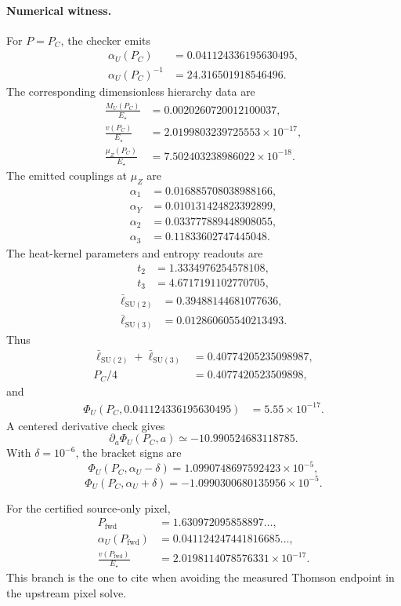 \paragraph{Numerical witness.}
For \(P=P_C\), the checker emits
\[
\begin{aligned}
\alpha_U(P_C)&=0.041124336195630495,\\
\alpha_U(P_C)^{-1}&=24.316501918546496.
\end{aligned}
\]
The corresponding dimensionless hierarchy data are
\[
\begin{aligned}
\frac{M_U(P_C)}{E_\star}&=0.0020260720012100037,\\
\frac{v(P_C)}{E_\star}&=2.0199803239725553\times10^{-17},\\
\frac{\mu_Z(P_C)}{E_\star}&=7.502403238986022\times10^{-18}.
\end{aligned}
\]
The emitted couplings at \(\mu_Z\) are
\[
\begin{aligned}
\alpha_1&=0.016885708038988166,\\
\alpha_Y&=0.010131424823392899,\\
\alpha_2&=0.033777889448908055,\\
\alpha_3&=0.11833602747445048.
\end{aligned}
\]
The heat-kernel parameters and entropy readouts are
\[
\begin{aligned}
t_2&=1.3334976254578108,\\
t_3&=4.6717191102770705,
\end{aligned}
\]
\[
\begin{aligned}
\bar\ell_{\mathrm{SU}(2)}&=0.39488144681077636,\\
\bar\ell_{\mathrm{SU}(3)}&=0.012860605540213493.
\end{aligned}
\]
Thus
\[
\begin{aligned}
\bar\ell_{\mathrm{SU}(2)}+\bar\ell_{\mathrm{SU}(3)}
&=0.40774205235098987,\\
P_C/4&=0.4077420523509898,
\end{aligned}
\]
and
\[
\begin{aligned}
\Phi_U(P_C,0.041124336195630495)
&=5.55\times10^{-17}.
\end{aligned}
\]
A centered derivative check gives
\[
\partial_a\Phi_U(P_C,a)\simeq -10.990524683118785.
\]
With \(\delta=10^{-6}\), the bracket signs are
\[
\Phi_U(P_C,\alpha_U-\delta)=1.0990748697592423\times10^{-5},
\]
\[
\Phi_U(P_C,\alpha_U+\delta)=-1.0990300680135956\times10^{-5}.
\]

For the certified source-only pixel,
\[
\begin{aligned}
P_{\mathrm{fwd}}&=1.630972095858897\ldots,\\
\alpha_U(P_{\mathrm{fwd}})&=0.041124247441816685\ldots,\\
\frac{v(P_{\mathrm{fwd}})}{E_\star}&=2.0198114078576331\times10^{-17}.
\end{aligned}
\]
This branch is the one to cite when avoiding the measured Thomson endpoint in the upstream pixel
solve.


